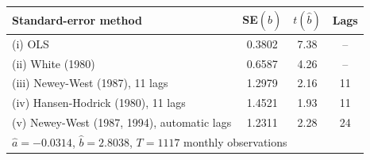 \begin{tabular}{lccc}
\toprule
Standard-error method & SE$(\hat b)$ & $t(\hat b)$ & Lags \\
\midrule
(i) OLS & 0.3802 & 7.38 & -- \\
(ii) White (1980) & 0.6587 & 4.26 & -- \\
(iii) Newey-West (1987), 11 lags & 1.2979 & 2.16 & 11 \\
(iv) Hansen-Hodrick (1980), 11 lags & 1.4521 & 1.93 & 11 \\
(v) Newey-West (1987, 1994), automatic lags & 1.2311 & 2.28 & 24 \\
\midrule
\multicolumn{4}{l}{$\hat a = -0.0314$, \quad $\hat b = 2.8038$, \quad $T = 1117$ monthly observations} \\
\bottomrule
\end{tabular}
